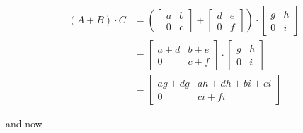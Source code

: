 \documentclass{article}
\begin{document}
    \begin{equation*}
      \begin{split}
         (A + B) \cdot C &= 
          \left( 
          \begin{bmatrix}
            a & b\\
            0 & c
          \end{bmatrix}
         +
        \begin{bmatrix} 
          d & e\\
          0 & f
        \end{bmatrix}
        \right) \cdot \begin{bmatrix}
          g & h\\
          0 & i
        \end{bmatrix} \\
        &=
          \begin{bmatrix}
            a+d & b+e\\
            0 & c+f
          \end{bmatrix} \cdot 
          \begin{bmatrix}
            g & h\\
            0 & i
          \end{bmatrix}\\
        &=
          \begin{bmatrix}
            ag + dg & ah+dh+bi+ei\\
            0 & ci+fi
          \end{bmatrix}
      \end{split}
    \end{equation*}

   \noindent and now
\end{document}
